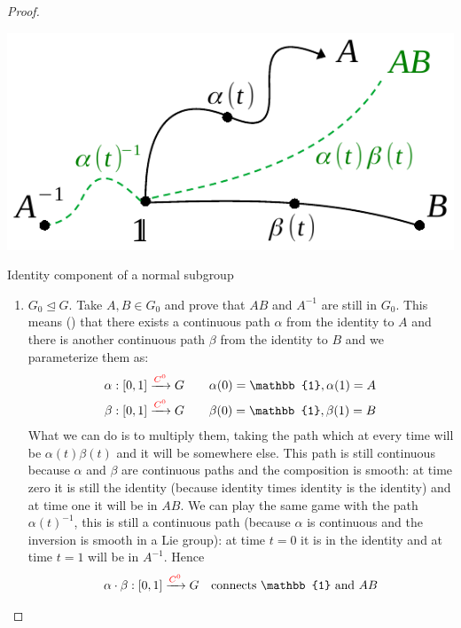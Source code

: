 \documentclass[../main.tex]{subfiles}
\begin{document}
\begin{proof}
\begin{marginfigure}
	\includegraphics[width=1.1\linewidth]{images/id-is.norm-sub.pdf}
	\caption{Identity component of a normal subgroup}
\end{marginfigure}
\begin{enumerate}
    \item $G_0\trianglelefteq G$. Take $A,B\in G_0$ and prove that $AB$ and $A^{-1}$ are still in $G_0$. This means () that there exists a continuous path $\alpha$ from the identity to $A$ and there is another continuous path $\beta$ from the identity to $B$ and we parameterize them as:
    \[
    \begin{split}
    \alpha:\comm{0}{1}\xrightarrow{{\color{red}C^0}} G \qquad &\alpha(0)=\mathbb{1}, \alpha(1) = A\\
    \beta:\comm{0}{1}\xrightarrow{{\color{red}C^0}} G \qquad &\beta(0)=\mathbb{1}, \beta(1) = B
    \end{split}
    \]
    What we can do is to multiply them, taking the path which at every time will be $\alpha(t)\beta(t)$ and it will be somewhere else. This path is still continuous because $\alpha$ and $\beta$ are continuous paths and the composition is smooth: at time zero it is still the identity (because identity times identity is the identity) and at time one it will be in $AB$. We can play the same game with the path $\alpha(t)^{-1}$, this is still a continuous path (because $\alpha$ is continuous and the inversion is smooth in a Lie group): at time $t=0$ it is in the identity and at time $t=1$ will be in $A^{-1}$. Hence
    \[
    \begin{split}
    \alpha\cdot\beta:\comm{0}{1}\xrightarrow{{\color{red}C^0}} G \quad &\textrm{connects} \ \mathbb{1} \textrm{ and } AB\\

\end{split}\]
\end{enumerate}
\end{proof}
\end{document}
